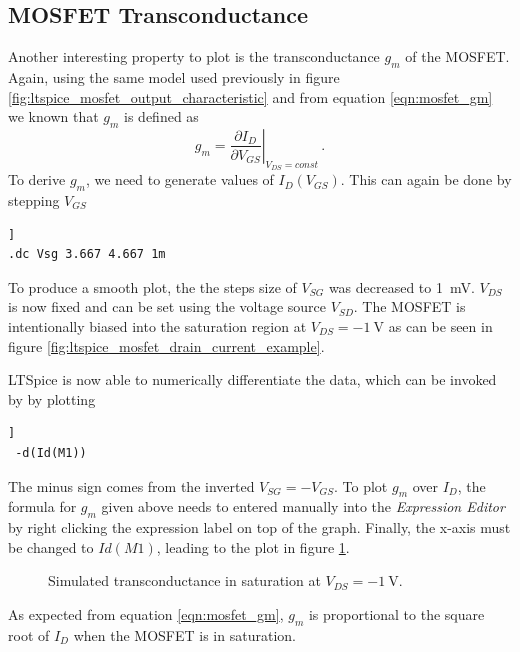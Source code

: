 \documentclass[12pt]{book}
\begin{document}
\subsection{MOSFET Transconductance}
Another interesting property to plot is the transconductance $g_m$ of the MOSFET. Again, using the same model used previously in figure \ref{fig:ltspice_mosfet_output_characteristic} and from equation \ref{eqn:mosfet_gm} we known that $g_m$ is defined as
\begin{equation}
    g_{m} = \left. \frac{\partial I_{D}}{\partial V_{GS}} \right|_{V_{DS} = const} \,. \nonumber
\end{equation}
To derive $g_m$, we need to generate values of $I_D(V_{GS})$. This can again be done by stepping $V_{GS}$
\begin{lstlisting}[frame=single, xleftmargin=5mm, xrightmargin=5mm, columns=fullflexible, morekeywords={model, dc}, keywordstyle=\bfseries, basicstyle=\rmfamily]]
.dc Vsg 3.667 4.667 1m
\end{lstlisting}
To produce a smooth plot, the the steps size of $V_{SG}$ was decreased to \qty{1}{\mV}. $V_{DS}$ is now fixed and can be set using the voltage source $V_{SD}$. The MOSFET is intentionally biased into the saturation region at $V_{DS} = \qty{-1}{\V}$ as can be seen in figure \ref{fig:ltspice_mosfet_drain_current_example}.

LTSpice is now able to numerically differentiate the data, which can be invoked by by plotting
\begin{lstlisting}[frame=single, xleftmargin=5mm, xrightmargin=5mm, columns=fullflexible, morekeywords={model, dc}, keywordstyle=\bfseries, basicstyle=\rmfamily]]
 -d(Id(M1))
\end{lstlisting}

The minus sign comes from the inverted $V_{SG} = -V_{GS}$. To plot $g_m$ over $I_D$, the formula for $g_m$ given above needs to entered manually into the \textit{Expression Editor} by right clicking the expression label on top of the graph. Finally, the x-axis must be changed to $Id(M1)$, leading to the plot in figure \ref{fig:ltspice_mosfet_gm_example}.

\begin{figure}[hb]
    \centering
    
    \caption{Simulated transconductance in saturation at $V_{DS} = \qty{-1}{\V}$.}
    \label{fig:ltspice_mosfet_gm_example}
\end{figure}

As expected from equation \ref{eqn:mosfet_gm}, $g_m$ is proportional to the square root of $I_D$ when the MOSFET is in saturation.
\end{document}

